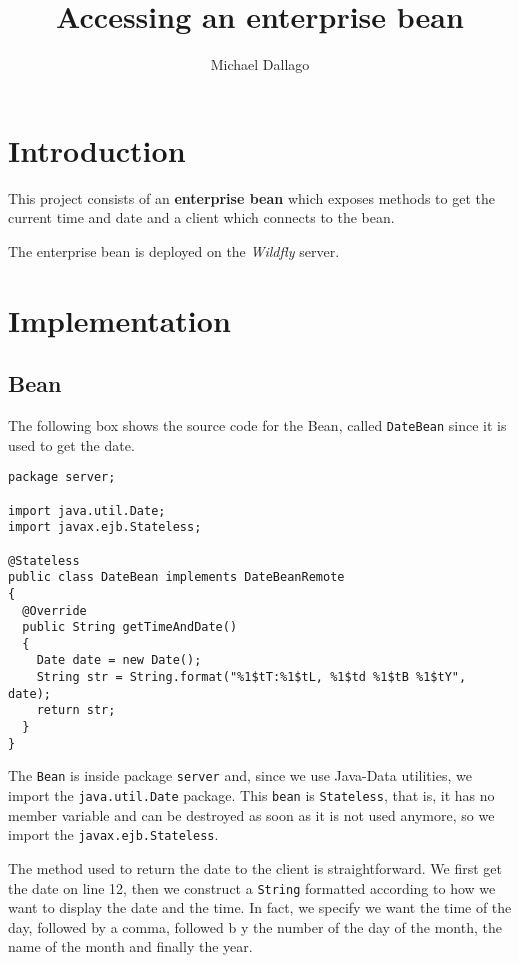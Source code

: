 \documentclass{report}
\begin{document}
\title{Accessing an enterprise bean}
\author{Michael Dallago}

\maketitle

\chapter{Introduction}
This project consists of an \textbf{enterprise bean} which exposes methods to get the current time and date and a client which connects to the bean.

The enterprise bean is deployed on the \textit{Wildfly} server.

\chapter{Implementation}
\section{Bean}
 The following box shows the source code for the Bean, called \texttt{DateBean} since it is used to get the date.

\begin{lstlisting}
package server;

import java.util.Date;
import javax.ejb.Stateless;

@Stateless
public class DateBean implements DateBeanRemote
{
  @Override
  public String getTimeAndDate()
  {
    Date date = new Date();
    String str = String.format("%1$tT:%1$tL, %1$td %1$tB %1$tY", date);
    return str;
  }
}
\end{lstlisting}

The \texttt{Bean} is inside package \texttt{server} and, since we use Java-Data utilities, we import the \texttt{java.util.Date} package. This \texttt{bean} is \texttt{Stateless}, that is, it has no member variable and can be destroyed as soon as it is not used anymore, so we import the \texttt{javax.ejb.Stateless}.

The method used to return the date to the client is straightforward. We first get the date on line 12, then we construct a \texttt{String} formatted according to how we want to display the date and the time. In fact, we specify we want the time of the day, followed by a comma, followed b y the number of the day of the month, the name of the month and finally the year.
\end{document}
